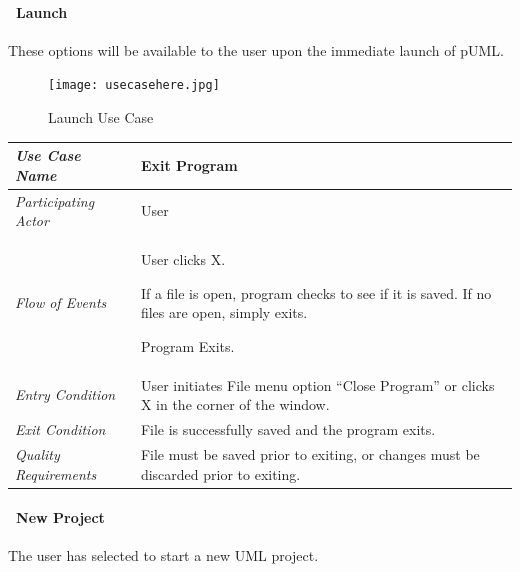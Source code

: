 \documentclass[twoside,letterpaper]{article}
\newenvironment{my_enumerate}{
\begin{enumerate}
  \setlength{\itemsep}{1pt}
  \setlength{\parskip}{0pt}
  \setlength{\parsep}{0pt}}{\end{enumerate}
}
\begin{document}
\paragraph[\ Use Category]
{\ Launch} {These options will be available to the user upon the immediate launch of pUML.}

\begin{figure}[h]
\centering
\texttt{[image: usecasehere.jpg]}
\caption{Launch Use Case}
\end{figure}

\begin{flushleft}
\tablehead{}
\begin{tabular}{|m{2.0in} m{5.0in}|}
\hline
{\bfseries\emph{Use Case Name}}
& {\bfseries Exit Program}
\\\hline
\emph{Participating Actor}
& User
\\\hline
\emph{Flow of Events}
& \begin{my_enumerate}
\item User clicks X.
\item If a file is open, program checks to see if it is saved.  If no files are open, simply exits.
\item Program Exits.
\end{my_enumerate}
\\\hline
\emph{Entry Condition}
&
User initiates File menu option ``Close Program'' or clicks X in the corner of the window.
\\\hline
\emph{Exit Condition}
& File is successfully saved and the program exits.
\\\hline
\emph{Quality Requirements}
& File must be saved prior to exiting, or changes must be discarded prior to exiting.
\\\hline
\end{tabular}
\end{flushleft}
\bigskip

\clearpage

\paragraph[\ Use Category]
{\ New Project} 
{The user has selected to start a new UML project.}
\end{document}
